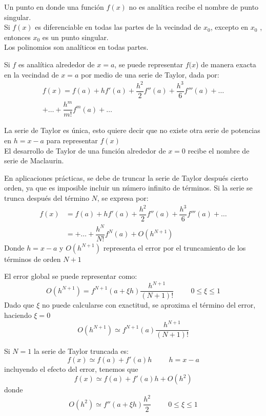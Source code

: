 \begin{frame}
Un punto en donde una función $f(x)$ no es analítica recibe el nombre de punto singular. 
\\
\medskip
Si $f(x)$ es diferenciable en todas las partes de la vecindad de $x_{0}$, excepto en $x_{0}$ , entonces $x_{0}$ es un punto singular.
\\
\medskip
Los polinomios son analíticos en todas partes.
\end{frame}
\begin{frame}
Si $f$ es analítica alrededor de $x = a$, se puede representar $f(x$) de manera exacta en la
vecindad de $x = a$ por medio de una serie de Taylor, dada por:
\fontsize{14}{14}\selectfont
\[ \begin{split} 
f(x) = f(a) + hf'(a) + \dfrac{h^{2}}{2} f''(a) + \dfrac{h^{3}}{6} f'''(a) + \ldots \\
+ \ldots + \dfrac{h^{m}}{m!} f^{m}(a) + \ldots
\end{split}
\]
\end{frame}
\begin{frame}
La serie de Taylor es única, esto quiere decir que no existe otra serie de potencias en $h = x-a$ para representar $f(x)$
\\
\bigskip
El desarrollo de Taylor de una función alrededor de $x = 0$ recibe el nombre de serie de Maclaurin.
\end{frame}
\begin{frame}
En aplicaciones prácticas, se debe de truncar la serie de Taylor después cierto orden, ya que es imposible incluir un número infinito de términos. Si la serie se trunca después del término $N$, se expresa por:
\[ \begin{split} f(x) &= f(a) + hf'(a) + \dfrac{h^{2}}{2} f''(a) + \dfrac{h^{3}}{6} f'''(a) + \ldots \\
&= + \ldots + \dfrac{h^{N}}{N!} f^{N}(a) + O(h^{N+1}) 
\end{split} \]
Donde $h=x-a$ y $O(h^{N+1})$ representa el error por el truncamiento de los términos de orden $N+1$
\end{frame}
\begin{frame}
El error global se puede representar como:
\[O(h^{N+1}) = f^{N+1}(a + \xi h) \dfrac{h^{N+1}}{(N+1)!} \hspace{1cm} 0 \leq \xi \leq 1\]
Dado que $\xi$ no puede calcularse con exactitud, se aproxima el término del error, haciendo $\xi = 0$
\[ O(h^{N+1}) \simeq f^{N+1}(a) \dfrac{h^{N+1}}{(N+1)!}\]
\end{frame}
\begin{frame}
Si $N=1$ la serie de Taylor truncada es:
\[f(x) \simeq f(a) + f'(a) h \hspace{1cm} h=x-a\]
incluyendo el efecto del error, tenemos que
\[f(x) \simeq f(a) + f'(a) h + O(h^{2}) \]
donde
\[O(h^{2}) \simeq f''(a+ \xi h) \dfrac{h^{2}}{2} \hspace{1cm} 0 \leq \xi \leq 1\]
\end{frame}
